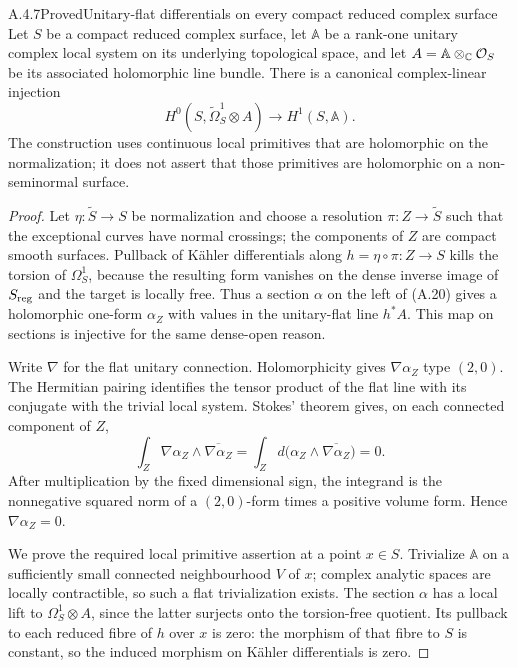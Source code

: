 
\begin{statement}{A.4.7}{Proved}{Unitary-flat differentials on every compact reduced complex surface}
Let $S$ be a compact reduced complex surface, let $\mathbb A$ be a rank-one unitary complex local system on its underlying topological space, and let $A=\mathbb A\otimes_{\mathbb C}\mathcal O_S$ be its associated holomorphic line bundle. There is a canonical complex-linear injection
\[
 H^0(S,\widetilde\Omega_S^1\otimes A)
       \longrightarrow H^1(S,\mathbb A).
 \tag{A.20}
\]
The construction uses continuous local primitives that are holomorphic on the normalization; it does not assert that those primitives are holomorphic on a non-seminormal surface.
\end{statement}
\begin{proof}
Let $\eta:\widetilde S\to S$ be normalization and choose a resolution $\pi:Z\to\widetilde S$ such that the exceptional curves have normal crossings; the components of $Z$ are compact smooth surfaces. Pullback of Kähler differentials along $h=\eta\circ\pi:Z\to S$ kills the torsion of $\Omega_S^1$, because the resulting form vanishes on the dense inverse image of $S_{\rm reg}$ and the target is locally free. Thus a section $\alpha$ on the left of (A.20) gives a holomorphic one-form $\alpha_Z$ with values in the unitary-flat line $h^*A$. This map on sections is injective for the same dense-open reason.

Write $\nabla$ for the flat unitary connection. Holomorphicity gives $\nabla\alpha_Z$ type $(2,0)$. The Hermitian pairing identifies the tensor product of the flat line with its conjugate with the trivial local system. Stokes' theorem gives, on each connected component of $Z$,
\[
 \int_Z \nabla\alpha_Z\wedge\overline{\nabla\alpha_Z}
 =\int_Z d\bigl(\alpha_Z\wedge\overline{\nabla\alpha_Z}\bigr)=0.
\]
After multiplication by the fixed dimensional sign, the integrand is the nonnegative squared norm of a $(2,0)$-form times a positive volume form. Hence $\nabla\alpha_Z=0$.

We prove the required local primitive assertion at a point $x\in S$. Trivialize $\mathbb A$ on a sufficiently small connected neighbourhood $V$ of $x$; complex analytic spaces are locally contractible, so such a flat trivialization exists. The section $\alpha$ has a local lift to $\Omega_S^1\otimes A$, since the latter surjects onto the torsion-free quotient. Its pullback to each reduced fibre of $h$ over $x$ is zero: the morphism of that fibre to $S$ is constant, so the induced morphism on Kähler differentials is zero.


\end{proof}

